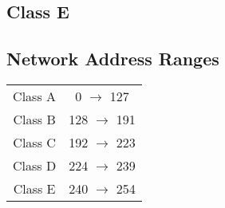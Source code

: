\documentclass[11pt]{article}
\begin{document}
\subsection{Class E}

\subsection{Network Address Ranges}
\begin{center}
    \begin{tabular}{ |c c| } 
     Class A & 0 $\rightarrow$ 127  \\ 
     Class B & 128 $\rightarrow$ 191  \\ 
     Class C & 192 $\rightarrow$ 223  \\ 
     Class D & 224 $\rightarrow$ 239  \\ 
     Class E & 240 $\rightarrow$ 254  
    \end{tabular}
    \end{center}
    
\end{document}
